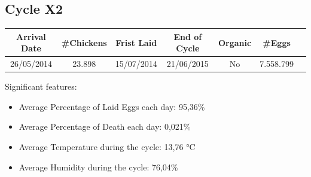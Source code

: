\documentclass[11pt]{article}
\begin{document}
\subsection{Cycle X2}
\begin{center}
    \begin{tabular}{| c | c | c | c | c | c | c |}
        \hline
        \textbf{Arrival Date} & \textbf{\#Chickens} & \textbf{Frist Laid} & \textbf{End of Cycle} & \textbf{Organic} & \textbf{\#Eggs}    \\ [0.5ex]
        \hline
        26/05/2014   & 23.898     & 15/07/2014 & 21/06/2015   & No      & 7.558.799 \\
        \hline
    \end{tabular}
\end{center}

Significant features:
\begin{itemize}
    \item Average Percentage of Laid Eggs each day: 95,36\%
    \item Average Percentage of Death each day: 0,021\%
    \item Average Temperature during the cycle: 13,76 °C
    \item Average Humidity during the cycle: 76,04\%
\end{itemize}
\end{document}
